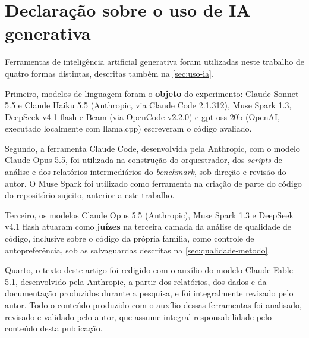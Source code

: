 
\section*{Declaração sobre o uso de IA generativa}
\label{sec:declaracao-uso-ia}

Ferramentas de inteligência artificial generativa foram utilizadas neste
trabalho de quatro formas distintas, descritas também na
\autoref{sec:uso-ia}.

Primeiro, modelos de linguagem foram o \textbf{objeto} do experimento: Claude
Sonnet 5.5 e Claude Haiku 5.5 (Anthropic, via Claude Code 2.1.312), Muse Spark
1.3, DeepSeek v4.1 flash e Beam (via OpenCode v2.2.0) e gpt-oss-20b (OpenAI,
executado localmente com llama.cpp) escreveram o código avaliado.

Segundo, a ferramenta Claude Code, desenvolvida pela Anthropic, com o modelo
Claude Opus 5.5, foi utilizada na construção do orquestrador, dos
\textit{scripts} de análise e dos relatórios intermediários do
\textit{benchmark}, sob direção e revisão do autor. O Muse Spark foi utilizado
como ferramenta na criação de parte do código do repositório-sujeito, anterior
a este trabalho.

Terceiro, os modelos Claude Opus 5.5 (Anthropic), Muse Spark 1.3 e DeepSeek
v4.1 flash atuaram como \textbf{juízes} na terceira camada da análise de
qualidade de código, inclusive sobre o código da própria família, como controle
de autopreferência, sob as salvaguardas descritas na
\autoref{sec:qualidade-metodo}.

Quarto, o texto deste artigo foi redigido com o auxílio do modelo Claude Fable
5.1, desenvolvido pela Anthropic, a partir dos relatórios, dos dados e da
documentação produzidos durante a pesquisa, e foi integralmente revisado pelo
autor. Todo o conteúdo produzido com o auxílio dessas ferramentas foi
analisado, revisado e validado pelo autor, que assume integral responsabilidade
pelo conteúdo desta publicação.
